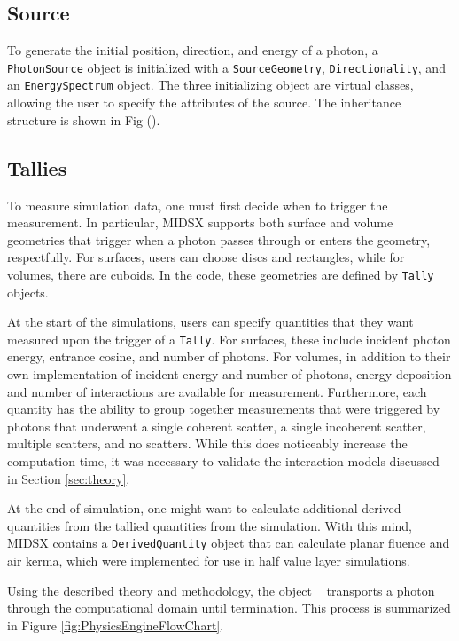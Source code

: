 \subsection{Source}
\par To generate the initial position, direction, and energy of a photon, a \texttt{PhotonSource} object is initialized with a \texttt{SourceGeometry}, \texttt{Directionality}, and an \texttt{EnergySpectrum} object. The three initializing object are virtual classes, allowing the user to specify the attributes of the source. The inheritance structure is shown in Fig (). 


\subsection{Tallies}
\par To measure simulation data, one must first decide when to trigger the measurement. In particular, MIDSX supports both surface and volume geometries that trigger when a photon passes through or enters the geometry, respectfully. For surfaces, users can choose discs and rectangles, while for volumes, there are cuboids. In the code, these geometries are defined by \texttt{Tally} objects.
\par At the start of the simulations, users can specify quantities that they want measured upon the trigger of a \texttt{Tally}. For surfaces, these include incident photon energy, entrance cosine, and number of photons. For volumes, in addition to their own implementation of incident energy and number of photons, energy deposition and number of interactions are available for measurement. Furthermore, each quantity has the ability to group together measurements that were triggered by photons that underwent a single coherent scatter, a single incoherent scatter, multiple scatters, and no scatters. While this does noticeably increase the computation time, it was necessary to validate the interaction models discussed in Section \ref{sec:theory}.
\par At the end of simulation, one might want to calculate additional derived quantities from the tallied quantities from the simulation. With this mind, MIDSX contains a \texttt{DerivedQuantity} object that can calculate planar fluence and air kerma, which were implemented for use in half value layer simulations.
\vspace{1cm}
\par Using the described theory and methodology, the object \texttt{ } transports a photon through the computational domain until termination. This process is summarized in Figure \ref{fig:PhysicsEngineFlowChart}.


